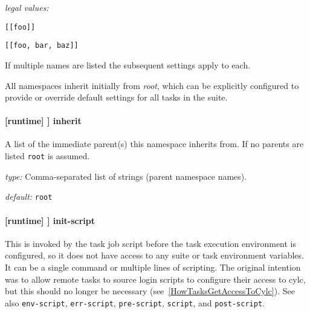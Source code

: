 
\begin{myitemize}
\item {\em legal values:}
    \begin{myitemize}
        \item \lstinline=[[foo]]=
        \item \lstinline=[[foo, bar, baz]]=
    \end{myitemize}
\end{myitemize}

If multiple names are listed the subsequent settings apply to each.

All namespaces inherit initially from {\em root}, which can be
explicitly configured to provide or override default settings
for all tasks in the suite.

\paragraph[inherit]{[runtime] \textrightarrow [[\_\_NAME\_\_]] \textrightarrow inherit}

A list of the immediate parent(s) this namespace inherits from. If no
parents are listed \lstinline=root= is assumed.

\begin{myitemize}
\item {\em type:} Comma-separated list of strings (parent namespace names).
\item {\em default:} \lstinline=root=
\end{myitemize}

\paragraph[init-script]{[runtime] \textrightarrow [[\_\_NAME\_\_]] \textrightarrow init-script}

This is invoked by the task job script before the task execution
environment is configured, so it does not have access to any suite or task
environment variables. It can be a single command or multiple lines of
scripting. The original intention was to allow remote tasks to
source login scripts to configure their access to cylc, but this should no
longer be necessary (see~\ref{HowTasksGetAccessToCylc}). See also
\lstinline=env-script=, \lstinline=err-script=, \lstinline=pre-script=,
\lstinline=script=, and \lstinline=post-script=.

